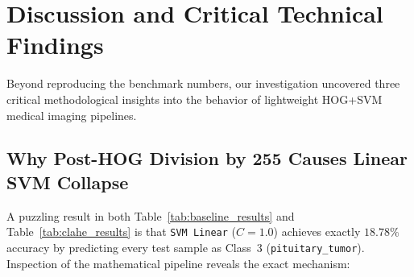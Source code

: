 \documentclass[conference]{IEEEtran}
\begin{document}
\section{Discussion and Critical Technical Findings}
\label{sec:discussion}

Beyond reproducing the benchmark numbers, our investigation uncovered three critical methodological insights into the behavior of lightweight HOG+SVM medical imaging pipelines.

\subsection{Why Post-HOG Division by 255 Causes Linear SVM Collapse}
A puzzling result in both Table~\ref{tab:baseline_results} and Table~\ref{tab:clahe_results} is that \texttt{SVM Linear} ($C=1.0$) achieves exactly $18.78\%$ accuracy by predicting every test sample as Class~3 (\texttt{pituitary\_tumor}). Inspection of the mathematical pipeline reveals the exact mechanism:
\end{document}
